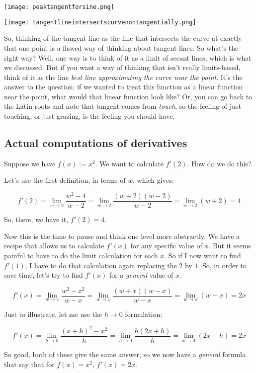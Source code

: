 \documentclass[10pt]{amsart}
\begin{document}
\texttt{[image: peaktangentforsine.png]}

\texttt{[image: tangentlineintersectscurvenontangentially.png]}

So, thinking of the tangent line as the line that intersects the curve
at exactly that one point is a flawed way of thinking about tangent
lines. So what's the right way? Well, one way is to think of it as a
limit of secant lines, which is what we discussed. But if you want a
way of thinking that isn't really limits-based, think of it as the
line {\em best line approximating the curve near the point}. It's the
answer to the question: if we wanted to treat this function as a
linear function near the point, what would that linear function look
like? Or, you can go back to the Latin roots and note that tangent
comes from {\em touch}, so the feeling of just touching, or just
grazing, is the feeling you should have.

\subsection{Actual computations of derivatives}

Suppose we have $f(x) := x^2$. We want to calculate $f'(2)$. How do we
do this?

Let's use the first definition, in terms of $w$, which gives:

$$f'(2) = \lim_{w \to 2} \frac{w^2 - 4}{w - 2} = \lim_{w \to 2} \frac{(w + 2)(w - 2)}{w - 2} = \lim_{w \to 2} (w + 2) = 4$$

So, there, we have it, $f'(2) = 4$.

Now this is the time to pause and think one level more abstractly. We
have a recipe that allows us to calculate $f'(x)$ for any specific
value of $x$. But it seems painful to have to do the limit calculation
for each $x$. So if I now want to find $f'(1)$, I have to do that
calculation again replacing the $2$ by $1$. So, in order to save time,
let's try to find $f'(x)$ for a {\em general} value of $x$.

$$f'(x) = \lim_{w \to x} \frac{w^2 - x^2}{w - x} = \lim_{w \to x} \frac{(w + x)(w - x)}{w - x} = \lim_{w \to x} (w + x) = 2x$$

Just to illustrate, let me use the $h \to 0$ formulation:

$$f'(x) = \lim_{h \to 0} \frac{(x + h)^2 - x^2}{h} = \lim_{h \to 0} \frac{h(2x + h)}{h} = \lim_{x \to 0} (2x + h) = 2x$$

So good, both of these give the same answer, so we now have a {\em
general} formula that say that for $f(x) = x^2$, $f'(x) = 2x$.
\end{document}
